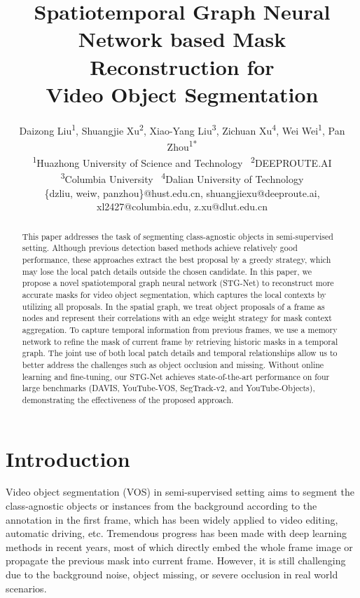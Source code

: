 \documentclass[letterpaper]{article} %
\title{Spatiotemporal Graph Neural Network based Mask Reconstruction for \\ Video Object Segmentation}
\author{Daizong Liu\textsuperscript{\rm 1}, Shuangjie Xu\textsuperscript{\rm 2}, Xiao-Yang Liu\textsuperscript{\rm 3}, Zichuan Xu\textsuperscript{\rm 4}, Wei Wei\textsuperscript{\rm 1}, Pan Zhou\textsuperscript{\rm 1*}\\
\textsuperscript{\rm 1}{\rm \normalsize Huazhong University of Science and Technology} \
\textsuperscript{\rm 2}{\rm \normalsize DEEPROUTE.AI}\\
\textsuperscript{\rm 3}{\rm \normalsize Columbia University} \
\textsuperscript{\rm 4}{\rm \normalsize Dalian University of Technology} \\
{\rm \normalsize \{dzliu, weiw, panzhou\}@hust.edu.cn, shuangjiexu@deeproute.ai, xl2427@columbia.edu, z.xu@dlut.edu.cn}
}
\begin{document}
\maketitle

\begin{abstract}
This paper addresses the task of segmenting class-agnostic objects in semi-supervised setting. Although previous detection based methods achieve relatively good performance, these approaches extract the best proposal by a greedy strategy, which may lose the local patch details outside the chosen candidate. In this paper, we propose a novel spatiotemporal graph neural network (STG-Net) to reconstruct more accurate masks for video object segmentation, which captures the local contexts by utilizing all proposals. In the spatial graph, we treat object proposals of a frame as nodes and represent their correlations with an edge weight strategy for mask context aggregation. To capture temporal information from previous frames, we use a memory network to refine the mask of current frame by retrieving historic masks in a temporal graph. The joint use of both local patch details and temporal relationships allow us to better address the challenges such as object occlusion and missing. Without online learning and fine-tuning, our STG-Net achieves state-of-the-art performance on four large benchmarks (DAVIS, YouTube-VOS, SegTrack-v2, and YouTube-Objects), demonstrating the effectiveness of the proposed approach.
\end{abstract}

\section{Introduction}
Video object segmentation (VOS) in semi-supervised setting aims to segment the class-agnostic objects or instances from the background according to the annotation in the first frame, which has been widely applied to video editing, automatic driving, etc.
Tremendous progress \cite{johnander2019generative,caelles2017one,wug2018fast,wang2019fast} has been made with deep learning methods in recent years,
most of which directly embed the whole frame image or propagate the previous mask into current frame.
However, it is still challenging due to the background noise, object missing, or severe occlusion in real world scenarios.
\end{document}

